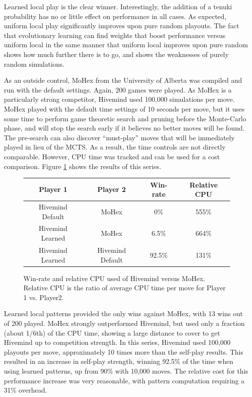 \documentclass[11pt]{report}
\begin{document}
Learned local play is the clear winner. Interestingly, the addition of a tenuki probability has no or little effect on performance in all cases. As expected, uniform local play significantly improves upon pure random playouts. The fact that evolutionary learning can find weights that boost performance versus uniform local in the same manner that uniform local improves upon pure random shows how much further there is to go, and shows the weaknesses of purely random simulations.

As an outside control, MoHex from the University of Alberta was compiled and run with the default settings\cite{mohex}. Again, 200 games were played. As MoHex is a particularly strong competitor, Hivemind used 100,000 simulations per move. MoHex played with the default time settings of 10 seconds per move, but it uses some time to perform game theoretic search and pruning before the Monte-Carlo phase, and will stop the search early if it believes no better moves will be found. The pre-search can also discover ``must-play'' moves that will be immediately played in lieu of the MCTS. As a result, the time controls are not directly comparable. However, CPU time was tracked and can be used for a cost comparison. Figure \ref{fig:relativecpu} shows the results of this series.

\begin{figure}
	\begin{center}
		\begin{tabular}{c c c c}
		Player 1 & Player 2 & Win-rate & Relative CPU \\
		\hline
		Hivemind Default & MoHex & 0\% & 555\% \\
		Hivemind Learned & MoHex & 6.5\% & 664\% \\
		Hivemind Learned & Hivemind Default & 92.5\% & 131\% \\
		\end{tabular}
		\caption{Win-rate and relative CPU used of Hivemind versus MoHex. Relative CPU is the ratio of average CPU time per move for Player 1 vs. Player2.}
		\label{fig:relativecpu}
	\end{center}
\end{figure}

Learned local patterns provided the only wins against MoHex, with 13 wins out of 200 played. MoHex strongly outperformed Hivemind, but used only a fraction (about 1/6th) of the CPU time, showing a large distance to cover to get Hivemind up to competition strength. In this series, Hivemind used 100,000 playouts per move, approximately 10 times more than the self-play results. This resulted in an increase in self-play strength, winning 92.5\% of the time when using learned patterns, up from 90\% with 10,000 moves. The relative cost for this performance increase was very reasonable, with pattern computation requiring a 31\% overhead.
\end{document}

